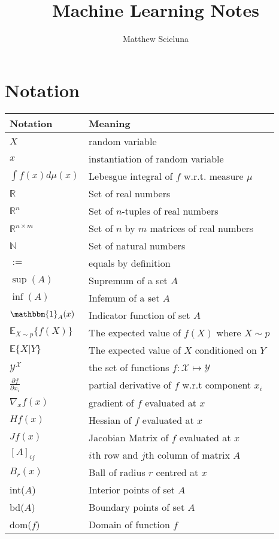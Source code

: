 \documentclass[]{article}
\theoremstyle{mattstyle}
\theoremstyle{definition}
\begin{document}
\title{Machine Learning Notes}
\author{Matthew Scicluna}
\maketitle

\newpage

\tableofcontents

\newpage

\section{Notation}

	\begin{center}		
		\begin{tabular}{*2l}   
			\toprule
			Notation & Meaning
			\\\midrule
			$X$ & random variable \\
			$x$ & instantiation of random variable\\
			$\int f(x) d\mu(x)$ & Lebesgue integral of $f$ w.r.t. measure $\mu$\\
			$\mathbb{R}$ & Set of real numbers\\
			$\mathbb{R}^n$ & Set of $n$-tuples of real numbers\\
			$\mathbb{R}^{n\times m}$ & Set of $n$ by $m$ matrices of real numbers\\
			$\mathbb{N}$ & Set of natural numbers \\
			$:=$ & equals by definition \\
			$\sup(A)$ & Supremum of a set $A$ \\
			$\inf(A)$ & Infemum of a set $A$ \\
			$\mathbbm{1}_{A}(x)$ & Indicator function of set $A$ \\
			$\mathbb{E}_{X\sim p}\{f(X)\}$ & The expected value of $f(X)$ where $X\sim p$\\
			$\mathbb{E}\{X|Y\}$ & The expected value of $X$ conditioned on $Y$ \\
			$\mathcal{Y}^\mathcal{X}$ & the set of functions $f: \mathcal{X}\mapsto \mathcal{Y}$\\
			$\frac{\partial f}{\partial x_i}$ & partial derivative of $f$ w.r.t component $x_i$\\
			$\nabla_{x} f(x)$ & gradient of $f$ evaluated at $x$\\
			$Hf(x)$ & Hessian of $f$ evaluated at $x$\\
			$Jf(x)$ & Jacobian Matrix of $f$ evaluated at $x$\\
			$[A]_{ij}$ & $i$th row and $j$th column of matrix $A$ \\
			$B_r(x)$ & Ball of radius $r$ centred at $x$ \\
			int($A$) & Interior points of set $A$ \\
			bd($A$) & Boundary points of set $A$ \\
			dom($f$) & Domain of function $f$
			\\\bottomrule
			\hline
		\end{tabular}
	\end{center}
\end{document}
